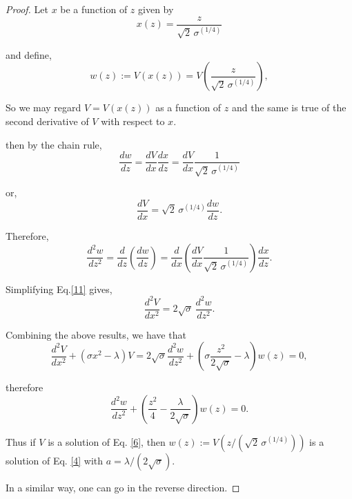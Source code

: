 \documentclass[10pt,a4paper]{amsart}
\begin{document}
\begin{proof}
Let $x$ be a function of $z$ given by
\begin{equation}
x(z)= \frac{z}{\sqrt{2}\,\sigma^{(1/4)}}\label{7}
\end{equation}

and define,
\begin{equation}
w(z):=V(x(z))= V\left(\frac{z}{\sqrt{2}\,\sigma^{(1/4)}}\right),\label{8}
\end{equation}

So we may regard $V=V(x(z))$ as a function of $z$ and the same is true of the second derivative of $V$ with respect to $x$. 

then by the chain rule,
\begin{equation}
\frac{dw}{dz}=\frac{dV}{dx}\frac{dx}{dz}=\frac{dV}{dx}\frac{1}{\sqrt{2}\,\sigma^{(1/4)}}\label{9}
\end{equation}

or,
\begin{equation}
\frac{dV}{dx}=\sqrt{2}\,\sigma^{(1/4)}\frac{dw}{dz}.\label{10}
\end{equation}

Therefore,
\begin{equation}
\frac{d^2w}{dz^2}=\frac{d}{dz}\left(\frac{dw}{dz}\right)=\frac{d}{dx}\left(\frac{dV}{dx}\frac{1}{\sqrt{2}\,\sigma^{(1/4)}}\right)\frac{dx}{dz}.\label{11}
\end{equation}

Simplifying Eq.\eqref{11} gives,
\begin{equation}
\frac{d^2 V}{dx^2}=2\sqrt{\sigma}\,\frac{d^2 w}{dz^2}\label{12}.
\end{equation}

Combining the above results, we have that
\begin{equation}
\frac{d^2 V}{dx^2}+(\sigma x^2 - \lambda)V= 2\sqrt{\sigma}\frac{d^2 w}{dz^2}+\left(\sigma \frac{z^2}{2\sqrt{\sigma}}-\lambda\right)\!w(z)=0,\label{13}
\end{equation}

therefore
\begin{equation}
\frac{d^2 w}{dz^2}+\left(\frac{z^2}{4}-\frac{\lambda}{2\sqrt{\sigma}}\right)\!w(z)=0.\label{14}
\end{equation}

Thus if $V$ is a solution of Eq. \eqref{6}, then $w(z):= V\!\left(z/(\sqrt{2}\,\sigma^{(1/4)})\right)$ is a solution of Eq. \eqref{4} with $a=\lambda/(2\sqrt{\sigma})$.

In a similar way, one can go in the reverse direction.


\end{proof}
\end{document}
